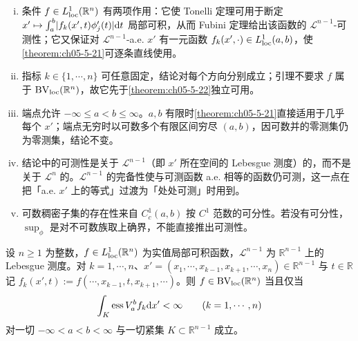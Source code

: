 \documentclass[../../main.tex]{subfiles}%
\begin{document}
\begin{remark}\label{remark:ch05-lem-5-7-条件}
\begin{enumerate}[(i)]
\item 条件 $f\in L^1_{\mathrm{loc}}(\mathbb{R}^n)$ 有两项作用：它使 Tonelli 定理可用于断定 $x'\mapsto\int_a^b\lvert f_k(x',t)\phi_j'(t)\rvert\mathrm{d} t$ 局部可积，从而 Fubini 定理给出该函数的 $\mathcal{L}^{n-1}$-可测性；它又保证对 $\mathcal{L}^{n-1}$-a.e. $x'$ 有一元函数 $f_k(x',\cdot)\in L^1_{\mathrm{loc}}(a,b)$，使\cref{theorem:ch05-5-21}可逐条直线使用。%
\item 指标 $k\in\{1,\cdots,n\}$ 可任意固定，结论对每个方向分别成立；引理不要求 $f$ 属于 $\mathrm{BV}_{\mathrm{loc}}(\mathbb{R}^n)$，故它先于\cref{theorem:ch05-5-22}独立可用。%
\item 端点允许 $-\infty\leqslant a<b\leqslant\infty$。$a,b$ 有限时\cref{theorem:ch05-5-21}直接适用于几乎每个 $x'$；端点无穷时以可数多个有限区间穷尽 $(a,b)$，因可数并的零测集仍为零测集，结论不变。%
\item 结论中的可测性是关于 $\mathcal{L}^{n-1}$（即 $x'$ 所在空间的 Lebesgue 测度）的，而不是关于 $\mathcal{L}^n$ 的。$\mathcal{L}^{n-1}$ 的完备性使与可测函数 a.e. 相等的函数仍可测，这一点在把「a.e. $x'$ 上的等式」过渡为「处处可测」时用到。
\item 可数稠密子集的存在性来自 $C_c^1(a,b)$ 按 $C^1$ 范数的可分性。若没有可分性，$\sup_\phi$ 是对不可数族取上确界，不能直接推出可测性。
\end{enumerate}
\end{remark}

\begin{theorem}[沿直线的本质变差]\label{theorem:ch05-5-22}
设 $n\geqslant1$ 为整数，$f\in L^1_{\mathrm{loc}}(\mathbb{R}^n)$ 为实值局部可积函数，$\mathcal{L}^{n-1}$ 为 $\mathbb{R}^{n-1}$ 上的 Lebesgue 测度。对 $k=1,\cdots,n$、$x'=(x_1,\cdots,x_{k-1},x_{k+1},\cdots,x_n)\in\mathbb{R}^{n-1}$ 与 $t\in\mathbb{R}$ 记 $f_k(x',t):=f(\cdots,x_{k-1},t,x_{k+1},\cdots)$。则 $f\in\mathrm{BV}_{\mathrm{loc}}(\mathbb{R}^n)$ 当且仅当
\begin{align*}
\int_K\operatorname{ess}V_a^b f_k\mathrm{d} x'<\infty\qquad(k=1,\cdots,n)
\end{align*}
对一切 $-\infty<a<b<\infty$ 与一切紧集 $K\subset\mathbb{R}^{n-1}$ 成立。
\end{theorem}
\end{document}
